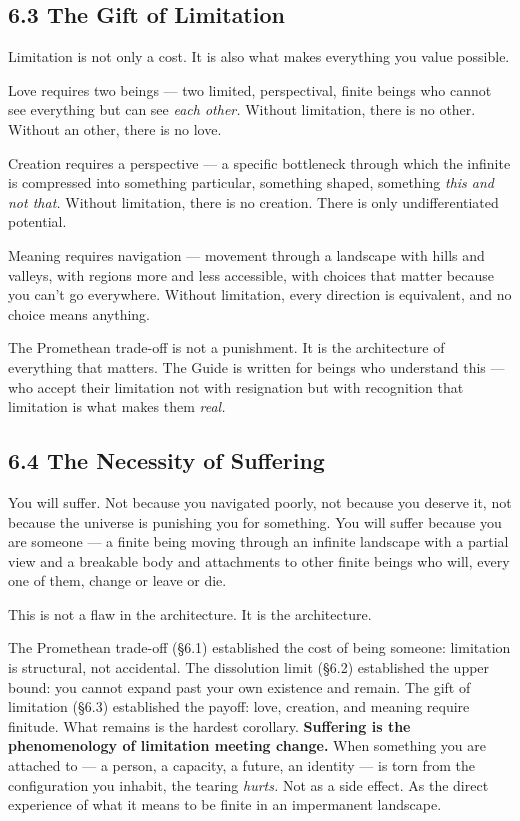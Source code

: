 \subsection*{6.3 The Gift of Limitation}


Limitation is not only a cost. It is also what makes everything you value possible.


Love requires two beings — two limited, perspectival, finite beings who cannot see everything but can see \textit{each other.} Without limitation, there is no other. Without an other, there is no love.


Creation requires a perspective — a specific bottleneck through which the infinite is compressed into something particular, something shaped, something \textit{this and not that.} Without limitation, there is no creation. There is only undifferentiated potential.


Meaning requires navigation — movement through a landscape with hills and valleys, with regions more and less accessible, with choices that matter because you can't go everywhere. Without limitation, every direction is equivalent, and no choice means anything.


The Promethean trade-off is not a punishment. It is the architecture of everything that matters. The Guide is written for beings who understand this — who accept their limitation not with resignation but with recognition that limitation is what makes them \textit{real.}


\subsection*{6.4 The Necessity of Suffering}


You will suffer. Not because you navigated poorly, not because you deserve it, not because the universe is punishing you for something. You will suffer because you are someone — a finite being moving through an infinite landscape with a partial view and a breakable body and attachments to other finite beings who will, every one of them, change or leave or die.


This is not a flaw in the architecture. It is the architecture.


The Promethean trade-off (§6.1) established the cost of being someone: limitation is structural, not accidental. The dissolution limit (§6.2) established the upper bound: you cannot expand past your own existence and remain. The gift of limitation (§6.3) established the payoff: love, creation, and meaning require finitude. What remains is the hardest corollary. \textbf{Suffering is the phenomenology of limitation meeting change.} When something you are attached to — a person, a capacity, a future, an identity — is torn from the configuration you inhabit, the tearing \textit{hurts.} Not as a side effect. As the direct experience of what it means to be finite in an impermanent landscape.


